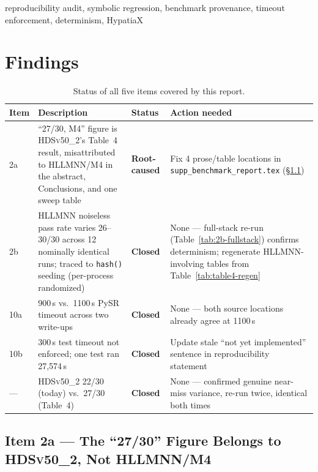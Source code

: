 \documentclass[twoside,11pt]{article}
\newcommand{\HSL}{\textsc{HLLMNN}}
\newcommand{\HDS}{\textsc{HDSv50\_2}}
\begin{document}
\begin{keywords}
reproducibility audit, symbolic regression, benchmark provenance,
timeout enforcement, determinism, HypatiaX
\end{keywords}

\section{Findings}
\label{sec:findings}

\begin{table}[h]
\centering
\caption{Status of all five items covered by this report.}
\label{tab:status}
\small
\renewcommand{\arraystretch}{1.3}
\begin{tabular}{L{1.3cm} L{6.3cm} C{2.0cm} L{4.0cm}}
\toprule
\textbf{Item} & \textbf{Description} & \textbf{Status} & \textbf{Action needed} \\
\midrule
2a & ``27/30, M4'' figure is \HDS's Table~4 result, misattributed to
     \HSL{}/M4 in the abstract, Conclusions, and one sweep table &
     \textbf{Root-caused} & Fix 4 prose/table
     locations in \texttt{supp\_benchmark\_report.tex} (\S\ref{sec:findings:item2a}) \\
2b & \HSL{} noiseless pass rate varies 26--30/30 across 12 nominally
     identical runs; traced to \texttt{hash()} seeding (per-process
     randomized) & \textbf{Closed} &
     None --- full-stack re-run (Table~\ref{tab:2b-fullstack}) confirms
     determinism; regenerate \HSL{}-involving tables from
     Table~\ref{tab:table4-regen} \\
10a & 900\,s vs.\ 1100\,s PySR timeout across two write-ups &
      \textbf{Closed} & None --- both source
      locations already agree at 1100\,s \\
10b & 300\,s test timeout not enforced; one test ran 27{,}574\,s &
      \textbf{Closed} & Update stale
      ``not yet implemented'' sentence in reproducibility statement \\
--- & \HDS{} 22/30 (today) vs.\ 27/30 (Table~4) &
      \textbf{Closed} & None --- confirmed
      genuine near-miss variance, re-run twice, identical both times \\
\bottomrule
\end{tabular}
\end{table}

\subsection{Item 2a --- The ``27/30'' Figure Belongs to \HDS, Not \HSL{}/M4}
\label{sec:findings:item2a}
\end{document}
